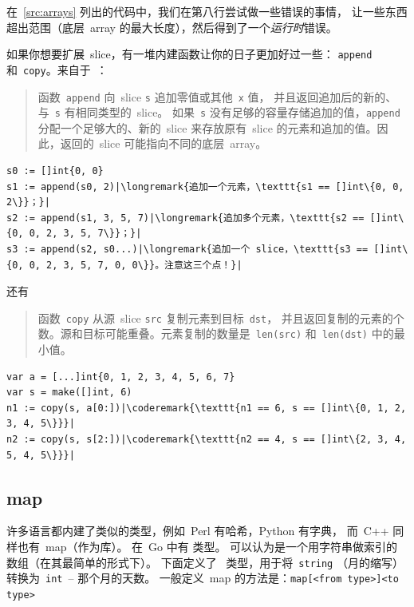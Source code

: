在~\ref{src:arrays} 列出的代码中，我们在第八行尝试做一些错误的事情，
让一些东西超出范围（底层~array 的最大长度），然后得到了一个\emph{运行时}错误。

如果你想要扩展~slice，有一堆内建函数让你的日子更加好过一些：
\lstinline{append} 和~\lstinline{copy}。来自于~\cite{go_spec}：
\begin{quote}
函数~\lstinline{append} 向~slice \lstinline{s} 追加零值或其他~\lstinline{x} 值，
并且返回追加后的新的、与~\lstinline{s} 有相同类型的~slice。
如果~\lstinline{s} 没有足够的容量存储追加的值，\lstinline{append} 分配一个足够大的、新的~slice
来存放原有~slice 的元素和追加的值。因此，返回的~slice 可能指向不同的底层~array。
\end{quote}
\begin{lstlisting}
s0 := []int{0, 0}
s1 := append(s0, 2)|\longremark{追加一个元素，\texttt{s1 == []int\{0, 0, 2\}}；}|
s2 := append(s1, 3, 5, 7)|\longremark{追加多个元素，\texttt{s2 == []int\{0, 0, 2, 3, 5, 7\}}；}|
s3 := append(s2, s0...)|\longremark{追加一个 slice，\texttt{s3 == []int\{0, 0, 2, 3, 5, 7, 0, 0\}}。注意这三个点！}|
\end{lstlisting}
\showremarks
还有
\begin{quote}
函数~\lstinline{copy} 从源~slice \lstinline{src} 复制元素到目标~\lstinline{dst}，
并且返回复制的元素的个数。源和目标可能重叠。元素复制的数量是~\lstinline{len(src)} 
和~\mbox{\lstinline{len(dst)}} 中的最小值。
\end{quote}
\begin{lstlisting}
var a = [...]int{0, 1, 2, 3, 4, 5, 6, 7}
var s = make([]int, 6)
n1 := copy(s, a[0:])|\coderemark{\texttt{n1 == 6, s == []int\{0, 1, 2, 3, 4, 5\}}}|
n2 := copy(s, s[2:])|\coderemark{\texttt{n2 == 4, s == []int\{2, 3, 4, 5, 4, 5\}}}|
\end{lstlisting}

\subsection{map}
\label{sec:maps}
许多语言都内建了类似的类型，例如~Perl 有哈希，Python 有字典，
而~C++ 同样也有~map（作为库）。 
在~Go 中有  类型。 
可以认为是一个用字符串做索引的数组（在其最简单的形式下）。
下面定义了~ 类型，用于将~\lstinline{string} （月的缩写）转换为~\lstinline{int}~-- 那个月的天数。 
一般定义~map 的方法是：\verb|map[<from type>]<to type>|

